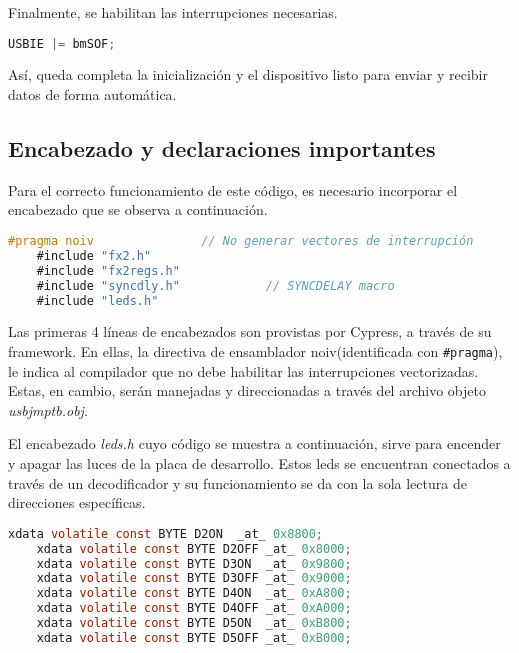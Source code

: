 	Finalmente, se habilitan las interrupciones necesarias.
	
%	
	\begin{lstlisting}[language=C,backgroundcolor=\color{gray!30}]
	USBIE |= bmSOF;
	\end{lstlisting}

	Así, queda completa la inicialización y el dispositivo listo para enviar y recibir datos de forma automática.
	
\subsection{Encabezado y declaraciones importantes}
	Para el correcto funcionamiento de este código, es necesario incorporar el encabezado que se observa a continuación.
	
	\begin{lstlisting}[language=C,backgroundcolor=\color{gray!30}]
	#pragma noiv               // No generar vectores de interrupción
	#include "fx2.h"
	#include "fx2regs.h"
	#include "syncdly.h"            // SYNCDELAY macro
	#include "leds.h"
	\end{lstlisting}
	
	Las primeras 4 líneas de encabezados son provistas por Cypress, a través de su framework. En ellas, la directiva de ensamblador noiv(identificada con \verb|#pragma|), le indica al compilador que no debe habilitar las interrupciones vectorizadas. Estas, en cambio, serán manejadas y direccionadas a través del archivo objeto {\it usbjmptb.obj}.%
	
	El encabezado {\it leds.h} cuyo código se muestra a continuación, sirve para encender y apagar las luces de la placa de desarrollo. Estos leds se encuentran conectados a través de un decodificador y su funcionamiento se da con la sola lectura de direcciones específicas.
	
	\begin{lstlisting}[language=C,backgroundcolor=\color{gray!30}]
	xdata volatile const BYTE D2ON	_at_ 0x8800;
	xdata volatile const BYTE D2OFF	_at_ 0x8000;
	xdata volatile const BYTE D3ON	_at_ 0x9800;
	xdata volatile const BYTE D3OFF	_at_ 0x9000;
	xdata volatile const BYTE D4ON	_at_ 0xA800;
	xdata volatile const BYTE D4OFF	_at_ 0xA000;
	xdata volatile const BYTE D5ON	_at_ 0xB800;
	xdata volatile const BYTE D5OFF	_at_ 0xB000;	\end{lstlisting}
	
